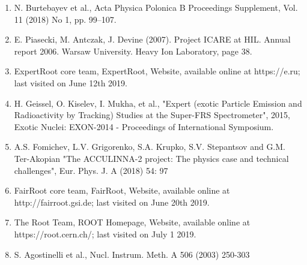 \documentclass[%
 aip,
cp,  %
 amsmath,amssymb,%
 reprint,%
]{revtex4-2}
\begin{document}
\begin{enumerate}
\item N. Burtebayev et al., Acta Physica Polonica B Proceedings Supplement, Vol. 11 (2018) No 1, pp. 99–107.
\item E. Piasecki, M. Antczak, J. Devine (2007). Project ICARE at HIL. Annual report 2006. Warsaw University. Heavy       Ion Laboratory, page 38.
\item ExpertRoot core team, ExpertRoot, Website, available online at https://e.ru; last visited on June 12th 2019.
\item H. Geissel, O. Kiselev, I. Mukha, et al., "Expert (exotic Particle Emission and Radioactivity by Tracking) Studies at the Super-FRS Spectrometer", 2015, Exotic Nuclei: EXON-2014 - Proceedings of International Symposium.
\item A.S. Fomichev, L.V. Grigorenko, S.A. Krupko, S.V. Stepantsov and G.M. Ter-Akopian "The ACCULINNA-2 project: The physics case and technical challenges", Eur. Phys. J. A (2018) 54: 97
\item FairRoot core team, FairRoot, Website, available online at http://fairroot.gsi.de; last visited on June 20th 2019.
\item The Root Team, ROOT Homepage, Website, available online at https://root.cern.ch/; last visited on July 1 2019.
\item S. Agostinelli et al., Nucl. Instrum. Meth. A 506 (2003) 250-303

\end{enumerate}
\end{document}
